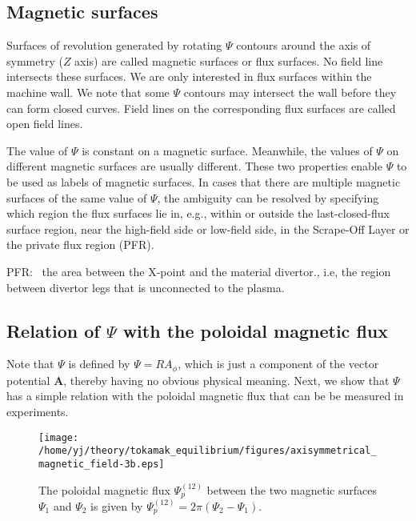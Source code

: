 \documentclass{llncs}
\begin{document}
\subsection{Magnetic surfaces}

Surfaces of revolution generated by rotating $\Psi$ contours around the axis
of symmetry ($Z$ axis) are called magnetic surfaces or flux surfaces. No field
line intersects these surfaces. We are only interested in flux surfaces within
the machine wall. We note that some $\Psi$ contours may intersect the wall
before they can form closed curves. Field lines on the corresponding flux
surfaces are called open field lines.

The value of $\Psi$ is constant on a magnetic surface. Meanwhile, the values
of $\Psi$ on different magnetic surfaces are usually different. These two
properties enable $\Psi$ to be used as labels of magnetic surfaces. In cases
that there are multiple magnetic surfaces of the same value of $\Psi$, the
ambiguity can be resolved by specifying which region the flux surfaces lie in,
e.g., within or outside the last-closed-flux surface region, near the
high-field side or low-field side, in the Scrape-Off Layer or the private flux
region (PFR).

PFR: \ the area between the X-point and the material divertor., i.e, the
region between divertor legs that is unconnected to the plasma.

\subsection{Relation of $\Psi$ with the poloidal magnetic flux}\label{9-5-5}

Note that $\Psi$ is defined by $\Psi = R A_{\phi}$, which is just a component
of the vector potential $\mathbf{A}$, thereby having no obvious physical
meaning. Next, we show that $\Psi$ has a simple relation with the poloidal
magnetic flux that can be be measured in experiments.

\begin{figure}[h]
  \texttt{[image: /home/yj/theory/tokamak\_equilibrium/figures/axisymmetrical\_magnetic\_field-3b.eps]}
  \caption{\label{9-8-p1}The poloidal magnetic flux $\Psi_p^{(12)}$ between
  the two magnetic surfaces $\Psi_1$ and $\Psi_2$ is given by $\Psi_p^{(12)} =
  2 \pi (\Psi_2 - \Psi_1)$.}
\end{figure}
\end{document}
